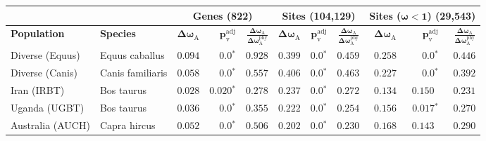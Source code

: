 \documentclass{article}
\begin{document}
    \begin{table*}[!ht]
        \centering
        \begin{adjustbox}{width = 1\textwidth}
            \begin{tabular}{||l|l||r|r|r||r|r|r||r|r|r||}
                \toprule
                \multicolumn{2}{||c||}{} &
                \multicolumn{3}{c||}{\textbf{Genes (822)}} &
                \multicolumn{3}{c||}{\textbf{Sites (104,129)}} &
                \multicolumn{3}{c||}{\textbf{Sites ($\bm{\omega < 1}$) (29,543)}}
                \\ \hline
                \textbf{Population} &
                \textbf{Species} &
                $\bm{\Delta \omega_{\mathrm{A}}}$ &
                $\bm{p_{\mathrm{v}}^{\mathrm{adj}}}$    &
                $\bm{\frac{\Delta\omega_{\mathrm{A}}}{\Delta\omega_{\mathrm{A}}^{\mathrm{phy}}}}$ &
                $\bm{\Delta \omega_{\mathrm{A}}}$ &
                $\bm{p_{\mathrm{v}}^{\mathrm{adj}}}$          &
                $\bm{\frac{\Delta\omega_{\mathrm{A}}}{\Delta\omega_{\mathrm{A}}^{\mathrm{phy}}}}$ &
                $\bm{\Delta \omega_{\mathrm{A}}}$ &
                $\bm{p_{\mathrm{v}}^{\mathrm{adj}}}$ &
                $\bm{\frac{\Delta\omega_{\mathrm{A}}}{\Delta\omega_{\mathrm{A}}^{\mathrm{phy}}}}$
                \\                \midrule
                Diverse (Equus)                                     & Equus caballus      & $ 0.094$ & $\bm{0.0{^*}}$    & $ 0.928$ & $ 0.399$ & $\bm{0.0{^*}}$ & $ 0.459$ & $ 0.258$ & $\bm{0.0{^*}}$ & $ 0.446$ \\
                \rowcolor{LIGHTGREY} Diverse (Canis)                & Canis familiaris    & $ 0.058$ & $\bm{0.0{^*}}$    & $ 0.557$                                                                     & $ 0.406$                      & $\bm{0.0{^*}}$ & $ 0.463$ & $ 0.227$ & $\bm{0.0{^*}}$ & $ 0.392$ \\
                Iran (IRBT)                                         & Bos taurus          & $ 0.028$ & $\bm{ 0.020{^*}}$ & $ 0.278$ & $ 0.237$ & $\bm{0.0{^*}}$ & $ 0.272$ & $ 0.134$ & $ 0.150~~$ & $ 0.231$ \\
                Uganda (UGBT)                                       & Bos taurus          & $ 0.036$ & $\bm{0.0{^*}}$    & $ 0.355$ & $ 0.222$ & $\bm{0.0{^*}}$ & $ 0.254$ & $ 0.156$ & $\bm{ 0.017{^*}}$ & $ 0.270$ \\
                \rowcolor{LIGHTGREY} Australia (AUCH)               & Capra hircus        & $ 0.052$ & $\bm{0.0{^*}}$    & $ 0.506$                                                                     & $ 0.202$                      & $\bm{0.0{^*}}$ & $ 0.230$ & $ 0.168$ & $ 0.143~~$ & $ 0.290$ \\

\end{tabular}
\end{adjustbox}
\end{table*}
\end{document}
